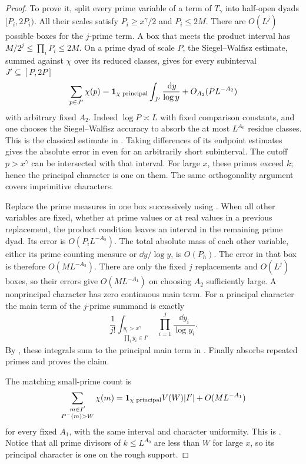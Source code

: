 \begin{proof}
To prove it, split every prime variable of a term of \(T_\gamma\) into
half-open dyads \([P_i,2P_i)\).  All their scales satisfy
\(P_i\ge x^\gamma/2\) and \(P_i\le2M\).  There are \(O(L^j)\) possible
boxes for the \(j\)-prime term.  A box that meets the product interval
has
\(M/2^j\le\prod_iP_i\le2M\).  On a prime dyad of scale \(P\), the
Siegel--Walfisz estimate, summed against \(\chi\) over its reduced
classes, gives for every subinterval \(J'\subseteq[P,2P]\)
\begin{equation}\label{eq:rough-slot-siegel-walfisz}
 \sum_{p\in J'}\chi(p)
 =\mathbf{1}_{\chi\text{ principal}}\int_{J'}\frac{\,\mathrm{d} y}{\log y}
          +O_{A_2}(P L^{-A_2})
\end{equation}
with arbitrary fixed \(A_2\).  Indeed \(\log P\asymp L\) with fixed
comparison constants, and one chooses the Siegel--Walfisz accuracy to
absorb the at most \(L^{A_0}\) residue classes.  This is the classical
estimate in \cite[Proposition~2.1]{PrimePredecessors}.  Taking
differences of its endpoint estimates gives the absolute error in
 even for an arbitrarily short
subinterval.  The cutoff \(p>x^\gamma\) can be intersected with that
interval.  For large \(x\), these primes exceed \(k\); hence the
principal character is one on them.  The same orthogonality argument
covers imprimitive characters.

Replace the prime measures in one box successively using
.  When all other variables are fixed,
whether at prime values or at real values in a previous replacement, the
product condition leaves an interval in the remaining prime dyad.  Its
error is \(O(P_iL^{-A_2})\).  The total absolute mass of each other
variable, either its prime counting measure or \(\dd y/\log y\), is
\(O(P_h)\).  The error in that box is therefore \(O(M L^{-A_2})\).
There are only the fixed \(j\) replacements and \(O(L^j)\) boxes, so
their errors give \(O(M L^{-A_1})\) on choosing \(A_2\) sufficiently
large.  A nonprincipal character has zero continuous main term.  For a
principal character the main term of the \(j\)-prime summand is exactly
\[
 \frac1{j!}\int_{\substack{y_i>x^\gamma\\\prod_i y_i\in I'}}
                    \prod_{i=1}^j\frac{\dd y_i}{\log y_i}.
\]
By , these integrals sum to the
principal main term in .
Finally  absorbs repeated
primes and proves the claim.

The matching small-prime count is
\begin{equation}\label{eq:rough-small-prime-character-count}
 \sum_{\substack{m\in I'\\P^-(m)>W}}\chi(m)
 =\mathbf{1}_{\chi\text{ principal}}V(W)|I'|+O(M L^{-A_1})
\end{equation}
for every fixed \(A_1\), with the same interval and character uniformity.
This is \cite[Lemma~2.5]{PoissonDirichlet}.  Notice that all prime divisors
of \(k\le L^{A_0}\) are less than \(W\) for large \(x\), so its principal
character is one on the rough support.


\end{proof}
